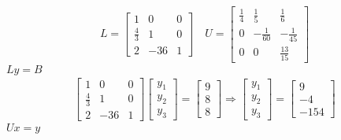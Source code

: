 \[
\begin{aligned}
    L=
    \left[
    \begin{array}{ccc}
        1 & 0 & 0 \\
        \frac{4}{3} & 1 & 0 \\
        2 & -36 & 1
    \end{array}
    \right]
    \quad
    U=
    \left[
    \begin{array}{ccc}
        \frac{1}{4} & \frac{1}{5} & \frac{1}{6} \\
        0 & -\frac{1}{60} & -\frac{1}{45} \\
        0 & 0 & \frac{13}{15}
    \end{array}
    \right]
\end{aligned}
\]
$Ly=B$
\[
\begin{aligned}
    \left[
    \begin{array}{ccc}
        1 & 0 & 0 \\
        \frac{4}{3} & 1 & 0 \\
        2 & -36 & 1
    \end{array}
    \right]
    \left[
    \begin{array}{c}
        y_1  \\
        y_2  \\
        y_3 
    \end{array}
    \right]
    =
    \left[
    \begin{array}{c}
        9  \\
        8  \\
        8 
    \end{array}
    \right]
    \Rightarrow{}
    \left[
    \begin{array}{c}
        y_1  \\
        y_2  \\
        y_3 
    \end{array}
    \right]
    =
    \left[
    \begin{array}{c}
        9  \\
        -4  \\
        -154 
    \end{array}
    \right]
\end{aligned}
\]
$Ux=y$
